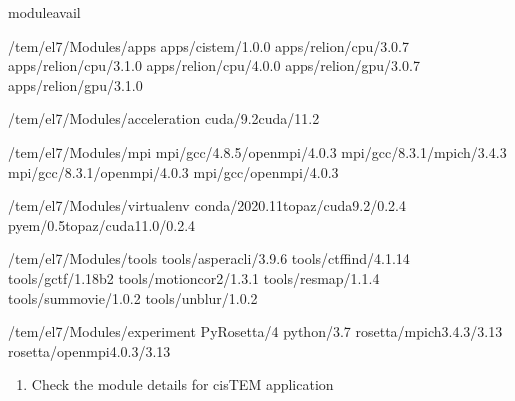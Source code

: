\documentclass[a4paper,11pt,english]{sphinxmanual}
\begin{document}
\begin{sphinxVerbatim}[commandchars=\\\{\}]
\PYGZdl{}\PYGZgt{}moduleavail

\PYGZhy{}\PYGZhy{}\PYGZhy{}\PYGZhy{}\PYGZhy{}\PYGZhy{}\PYGZhy{}\PYGZhy{}/tem/el7/Modules/apps\PYGZhy{}\PYGZhy{}\PYGZhy{}\PYGZhy{}\PYGZhy{}\PYGZhy{}\PYGZhy{}\PYGZhy{}
apps/cistem/1.0.0
apps/relion/cpu/3.0.7
apps/relion/cpu/3.1.0
apps/relion/cpu/4.0.0
apps/relion/gpu/3.0.7
apps/relion/gpu/3.1.0

\PYGZhy{}\PYGZhy{}\PYGZhy{}\PYGZhy{}/tem/el7/Modules/acceleration\PYGZhy{}\PYGZhy{}\PYGZhy{}\PYGZhy{}
cuda/9.2cuda/11.2

\PYGZhy{}\PYGZhy{}\PYGZhy{}\PYGZhy{}\PYGZhy{}\PYGZhy{}\PYGZhy{}\PYGZhy{}/tem/el7/Modules/mpi\PYGZhy{}\PYGZhy{}\PYGZhy{}\PYGZhy{}\PYGZhy{}\PYGZhy{}\PYGZhy{}\PYGZhy{}\PYGZhy{}
mpi/gcc/4.8.5/openmpi/4.0.3
mpi/gcc/8.3.1/mpich/3.4.3
mpi/gcc/8.3.1/openmpi/4.0.3
mpi/gcc/openmpi/4.0.3

\PYGZhy{}\PYGZhy{}\PYGZhy{}\PYGZhy{}\PYGZhy{}/tem/el7/Modules/virtualenv\PYGZhy{}\PYGZhy{}\PYGZhy{}\PYGZhy{}\PYGZhy{}
conda/2020.11topaz/cuda\PYGZhy{}9.2/0.2.4
pyem/0.5topaz/cuda\PYGZhy{}11.0/0.2.4

\PYGZhy{}\PYGZhy{}\PYGZhy{}\PYGZhy{}\PYGZhy{}\PYGZhy{}\PYGZhy{}/tem/el7/Modules/tools\PYGZhy{}\PYGZhy{}\PYGZhy{}\PYGZhy{}\PYGZhy{}\PYGZhy{}\PYGZhy{}\PYGZhy{}
tools/aspera\PYGZhy{}cli/3.9.6
tools/ctffind/4.1.14
tools/gctf/1.18\PYGZus{}b2
tools/motioncor2/1.3.1
tools/resmap/1.1.4
tools/summovie/1.0.2
tools/unblur/1.0.2

\PYGZhy{}\PYGZhy{}\PYGZhy{}\PYGZhy{}\PYGZhy{}/tem/el7/Modules/experiment\PYGZhy{}\PYGZhy{}\PYGZhy{}\PYGZhy{}\PYGZhy{}
PyRosetta/4
python/3.7
rosetta/mpich\PYGZhy{}3.4.3/3.13
rosetta/openmpi\PYGZhy{}4.0.3/3.13
\end{sphinxVerbatim}
\begin{enumerate}
%
\setcounter{enumi}{1}
\item {} 
\sphinxAtStartPar
Check the module details for cisTEM application

\end{enumerate}
\end{document}
